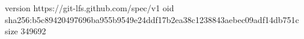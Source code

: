 version https://git-lfs.github.com/spec/v1
oid sha256:b5c89420497696ba955b9549e24ddf17b2ea38c1238843aebec09adf14db751c
size 349692
